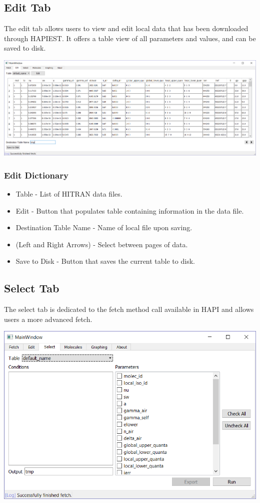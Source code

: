 \documentclass[12pt]{article}
\begin{document}
\subsection{Edit Tab}
The edit tab allows users to view and edit local data that has been downloaded through HAPIEST. It offers a table view of all parameters and values, and can be saved to disk.
\begin{center}
\includegraphics[scale = 0.4]{MainWindow_Edit}
\end{center}
\subsubsection{Edit Dictionary}
\begin{itemize}
\item Table - List of HITRAN data files.
\item Edit - Button that populates table containing information in the data file.
\item Destination Table Name - Name of local file upon saving.
\item (Left and Right Arrows) - Select between pages of data.
\item Save to Disk - Button that saves the  current table to disk.
\end{itemize}

\subsection{Select Tab}
The select tab is dedicated to the fetch method call available in HAPI and allows users a more advanced fetch.
\begin{center}
\includegraphics[scale = 0.6]{MainWindow_Select}
\end{center}
\end{document}
